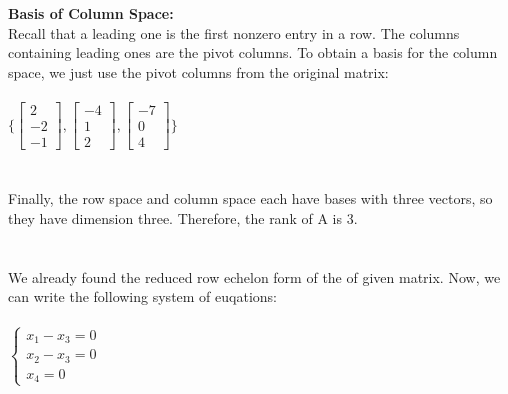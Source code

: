 \documentclass[fleqn]{article}
\begin{document}
\begin{enumerate}
{        \\
        \\
        \textbf{Basis of Column Space:} \\
        Recall that a leading one is the first nonzero entry in a row. The columns containing leading ones 
        are the pivot columns. To obtain a basis for the column space, we just use the pivot columns from 
        the original matrix:
        \\
        \\
        $
          \{ 
            \begin{bmatrix}
              2
              \\
              -2
              \\
              -1
            \end{bmatrix},
            \begin{bmatrix}
              -4
              \\
              1
              \\
              2
            \end{bmatrix},
            \begin{bmatrix}
              -7
              \\
              0
              \\
              4
            \end{bmatrix}
          \} 
        $
        \\
        \\
        \\
        Finally, the row space and column space each have bases with three vectors, so they have
        dimension three. Therefore, the rank of A is 3.
        \\
        \\
        \\
        We already found the reduced row echelon form of the of given matrix. Now, we can write the
        following system of euqations:
        \\
        \\
        $
            \begin{cases}
              x_1-x_3=0
              \\
              x_2-x_3=0
              \\
              x_4=0
            \end{cases}
        $
        \\
        \\
}
\end{enumerate}
\end{document}
